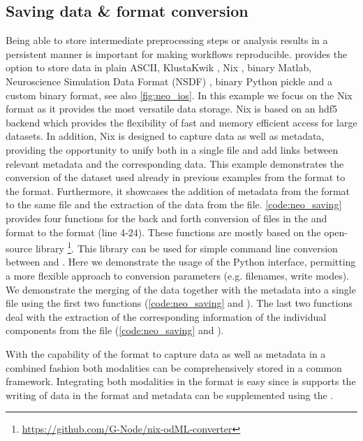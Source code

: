 \subsection{Saving data \& format conversion}
\label{sec:nix_format}
Being able to store intermediate preprocessing steps or analysis results in a persistent manner is important for making workflows reproducible.  provides the option to store data in plain ASCII, KlustaKwik \citep{Hazan_2006}, Nix \citep{Stoewer_2014}, binary Matlab, Neuroscience Simulation Data Format (NSDF) \citep{Ray_2016}, binary Python pickle and a custom binary format, see also \cref{fig:neo_ios}. In this example we focus on the Nix format as it provides the most versatile data storage. Nix is based on an hdf5 \citep{TheHDFGroup_1997} backend which provides the flexibility of fast and memory efficient access for large datasets. In addition, Nix is designed to capture data as well as metadata, providing the opportunity to unify both in a single file and add links between relevant metadata and the corresponding data. 
This example demonstrates the conversion of the dataset used already in previous examples from the  format to the  format. Furthermore, it showcases the addition of metadata from the  format to the same file and the extraction of the data from the  file.
\cref{code:neo_saving} provides four functions for the back and forth conversion of files in the  and  format to the  format (line 4-24). These functions are mostly based on the open-source  library \footnote{\url{https://github.com/G-Node/nix-odML-converter}}. This library can be used for simple command line conversion between  and . Here we demonstrate the usage of the Python interface, permitting a more flexible approach to conversion parameters (e.g. filenames, write modes).
We demonstrate the merging of the data together with the metadata into a single  file using the first two functions (\cref{code:neo_saving}  and ). The last two functions deal with the extraction of the corresponding information of the individual components from the  file (\cref{code:neo_saving}  and ).

With the capability of the  format to capture data as well as metadata in a combined fashion both modalities can be comprehensively stored in a common framework. Integrating both modalities in the  format is easy since  is supports the writing of data in the  format and metadata can be supplemented using the .

